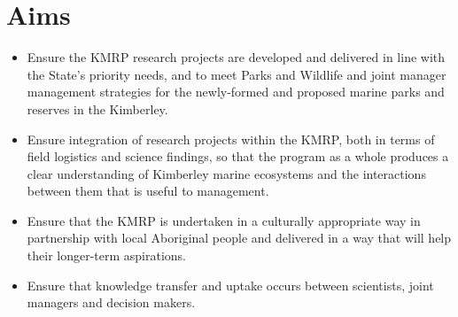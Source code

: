 \documentclass[version=last,
    paper=a4, %
    10pt, %
    usenames,
    dvipsnames,
    oneside, %
    headings=openany, %
    DIV=15 %
]{scrbook}
\begin{document}
\section*{Aims}
\begin{itemize}
\itemsep1pt\parskip0pt
\item
  Ensure the KMRP research projects are developed and delivered in line
  with the State's priority needs, and to meet Parks and Wildlife and
  joint manager management strategies for the newly-formed and proposed
  marine parks and reserves in the Kimberley.
\item
  Ensure integration of research projects within the KMRP, both in terms
  of field logistics and science findings, so that the program as a
  whole produces a clear understanding of Kimberley marine ecosystems
  and the interactions between them that is useful to management.
\item
  Ensure that the KMRP is undertaken in a culturally appropriate way in
  partnership with local Aboriginal people and delivered in a way that
  will help their longer-term aspirations.
\item
  Ensure that knowledge transfer and uptake occurs between scientists,
  joint managers and decision makers.
\end{itemize}
\end{document}

